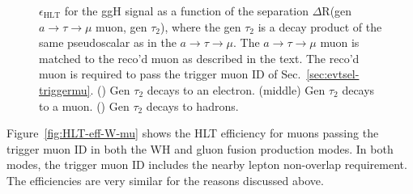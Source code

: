 \begin{figure}[hbtp]
\begin{center}
    \caption{$\epsilon_{\text{HLT}}$ for the ggH signal as a function of the separation $\Delta$R(gen $a\rightarrow\tau\rightarrow\mu$ muon, gen $\tau_{\text{2}}$), where the gen $\tau_{\text{2}}$ is a decay product of the same pseudoscalar as in the $a\rightarrow\tau\rightarrow\mu$.  The $a\rightarrow\tau\rightarrow\mu$ muon is matched to the reco'd muon as described in the text.  The reco'd muon is required to pass the trigger muon ID of Sec.~\ref{sec:evtsel-triggermu}.  (\cmsLeft) Gen $\tau_{\text{2}}$ decays to an electron.  (middle) Gen $\tau_{\text{2}}$ decays to a muon.  (\cmsRight) Gen $\tau_{\text{2}}$ decays to hadrons.}
    \label{fig:HLTEffVsDR_withFilters}
  \end{center}
\end{figure}

Figure~\ref{fig:HLT-eff-W-mu} shows the HLT efficiency for muons passing the trigger muon ID in both the WH and gluon fusion production modes.  In both modes, the trigger muon ID includes the nearby lepton non-overlap requirement.  The efficiencies are very similar for the reasons discussed above.

